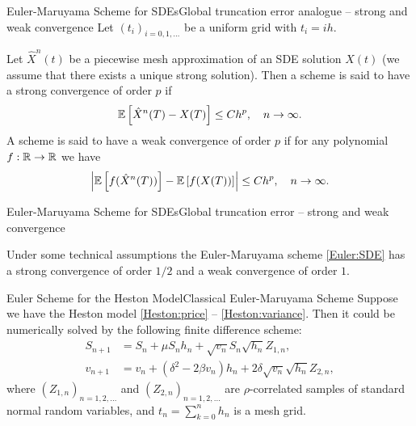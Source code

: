 \begin{frame}{Euler-Maruyama Scheme for SDEs}{Global truncation error analogue -- strong and weak convergence}
    Let $(t_i)_{i = 0, 1, \dots}$ be a uniform grid with $t_i = ih$.
    \begin{definition}
        Let $\hat X^n(t)$ be a piecewise mesh approximation of an SDE solution $X(t)$ (we assume that there exists a unique strong solution). 
        Then a scheme is said to have a strong convergence of order $p$ if 
        \begin{equation}
            \mathbb{E}\left[\hat X^n(T) - X(T)\right] \leq Ch^p, \quad n \to \infty.
        \end{equation}
        A scheme is said to have a weak convergence of order $p$ if for any polynomial $f: \mathbb{R} \to \mathbb{R}$ we have
        \begin{equation}
            \left|\mathbb{E}\left[f(\hat X^n(T))\right] - \mathbb{E}\left[f(X(T))\right]\right| \leq Ch^p, \quad n \to \infty.
        \end{equation}
    \end{definition}
    
\end{frame}

\begin{frame}{Euler-Maruyama Scheme for SDEs}{Global truncation error -- strong and weak convergence}
    \begin{theorem}
        Under some technical assumptions the Euler-Maruyama scheme \eqref{Euler:SDE} has a strong convergence of order $1/2$ and a weak convergence of order $1$.
    \end{theorem}
\end{frame}

\begin{frame}{Euler Scheme for the Heston Model}{Classical Euler-Maruyama Scheme}
    Suppose we have the Heston model \eqref{Heston:price} -- \eqref{Heston:variance}. Then it could be numerically solved by the following finite difference scheme:
    \begin{align}
        S_{n+1} & = S_n + \mu S_n h_n + \sqrt{v_n} S_n \sqrt{h_n} Z_{1,n}, \label{Euler:Heston:price}\\
        v_{n+1} & = v_n + \left(\delta^2 - 2\beta v_n\right) h_n + 2\delta \sqrt{v_n} \sqrt{h_n} Z_{2,n}, \label{Euler:Heston:variance}
    \end{align}
    where $(Z_{1,n})_{n=1, 2, \dots}$ and $(Z_{2,n})_{n=1, 2, \dots}$ are $\rho$-correlated samples of standard normal random variables, and $t_n = \sum_{k=0}^n h_n$ is a mesh grid.
\end{frame}

